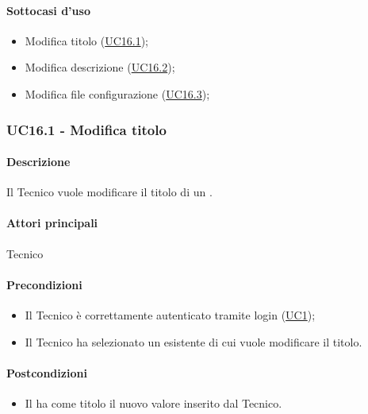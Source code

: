 \paragraph*{Sottocasi d'uso}
\begin{itemize}
  \item Modifica titolo  (\hyperref[UC16point1]{UC16.1});
  \item Modifica descrizione  (\hyperref[UC16point2]{UC16.2});
  \item Modifica file configurazione  (\hyperref[UC16point3]{UC16.3});
\end{itemize}


\subsubsection{UC16.1 - Modifica titolo }\label{UC16point1}
\paragraph*{Descrizione}
Il Tecnico vuole modificare il titolo di un .

\paragraph*{Attori principali}
Tecnico

\paragraph*{Precondizioni}
\begin{itemize}
  \item Il Tecnico è correttamente autenticato tramite login (\hyperref[UC1]{UC1});
  \item Il Tecnico ha selezionato un  esistente di cui vuole modificare il titolo.
\end{itemize}

\paragraph*{Postcondizioni}
\begin{itemize}
  \item Il  ha come titolo il nuovo valore inserito dal Tecnico.
\end{itemize}

